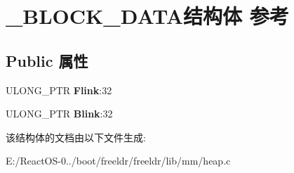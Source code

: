 \hypertarget{struct___b_l_o_c_k___d_a_t_a}{}\section{\+\_\+\+B\+L\+O\+C\+K\+\_\+\+D\+A\+T\+A结构体 参考}
\label{struct___b_l_o_c_k___d_a_t_a}
\subsection*{Public 属性}
\begin{DoxyCompactItemize}
\item 
\mbox{\label{struct___b_l_o_c_k___d_a_t_a_a8fc7a1d06aa86275a30b777afab923c4}} 
U\+L\+O\+N\+G\+\_\+\+P\+TR {\bfseries Flink}\+:32
\item 
\mbox{\label{struct___b_l_o_c_k___d_a_t_a_a4b0feda9229c02bcb8343aaa52906be6}} 
U\+L\+O\+N\+G\+\_\+\+P\+TR {\bfseries Blink}\+:32
\end{DoxyCompactItemize}


该结构体的文档由以下文件生成\+:\begin{DoxyCompactItemize}
\item 
E\+:/\+React\+O\+S-\/0../boot/freeldr/freeldr/lib/mm/heap.\+c\end{DoxyCompactItemize}
